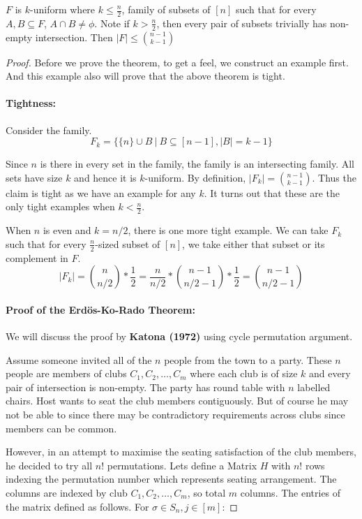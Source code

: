 \begin{theorem}
$F$ is $k$-uniform where $k\le \frac{n}{2}$, family of subsets of $[n]$ such that for every $A,B \subseteq F$, $A\cap B \neq \phi$. Note if $k> \frac{n}{2}$, then every pair of subsets trivially has non-empty intersection. Then $|F|\le {{n-1}\choose{k-1}}$

\begin{proof}
Before we prove the theorem, to get a feel, we construct an example first. And this example also will prove that the above theorem is tight.

\paragraph{Tightness:} 
Consider the family.
$$F_k=\{\{n\}\cup B ~|~ B\subseteq [n-1] ,|B|=k-1\}$$

Since $n$ is there in every set in the family, the family is an intersecting family. All sets have size $k$ and hence it is $k$-uniform. By definition, $|F_k|={{n-1}\choose{k-1}}$. Thus the claim is tight as we have an example for any $k$. It turns out that these are the only tight examples when $k < \frac{n}{2}$.

When $n$ is even and $k=n/2$, there is one more tight example. We can take $F_k$ such that for every $\frac{n}{2}$-sized subset of $[n]$, we take either that subset or its complement in $F$. 
$$|F_k|={{{n}\choose{n/2}}* \frac{1}{2}}=\frac{n}{n/2}* {{n-1}\choose n/2-1}* \frac{1}{2} = {{n-1}\choose{n/2-1}}$$

\paragraph{Proof of the {\bf Erd{\"o}s-Ko-Rado Theorem}:} We will discuss the proof by \textbf{Katona (1972)} using cycle permutation argument. 

Assume someone invited all of the $n$ people from the town to a party. These $n$ people are members of clubs $C_1, C_2, \hdots, C_m$ where each club is of size $k$ and every pair of intersection is non-empty. The party has round table with $n$ labelled chairs. Host wants to seat the club members contiguously. But of course he may not be able to since there may be contradictory requirements across clubs since members can be common. 

However, in an attempt to maximise the seating satisfaction of the club members, he decided to try all $n!$ permutations. Lets define a Matrix $H$ with $n!$ rows indexing the permutation number which represents seating arrangement. The columns are indexed by club $C_1, C_2, \hdots, C_m$, so total $m$ columns. The entries of the matrix defined as follows. For $\sigma \in S_n, j \in [m]$:


\end{proof}
\end{theorem}
